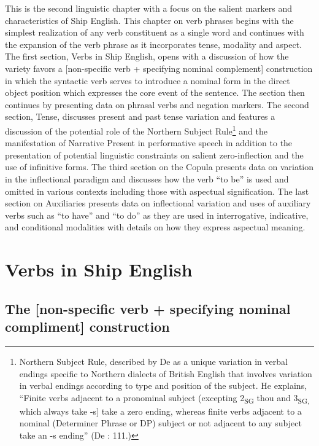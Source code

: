 This is the second linguistic chapter with a focus on the salient markers and characteristics of Ship English. This chapter on verb phrases begins with the simplest realization of any verb constituent as a single word and continues with the expansion of the verb phrase as it incorporates tense, modality and aspect. The first section, Verbs in Ship English, opens with a discussion of how the variety favors a [non-specific verb + specifying nominal complement] construction in which the syntactic verb serves to introduce a nominal form in the direct object position which expresses the core event of the sentence.  The section then continues by presenting data on phrasal verbs and negation markers. The second section, Tense, discusses present and past tense variation and features a discussion of the potential role of the Northern Subject Rule\footnote{Northern Subject Rule, described by De \citet{Haas2006} as a unique variation in verbal endings specific to Northern dialects of British English that involves variation in verbal endings according to type and position of the subject. He explains, “Finite verbs adjacent to a pronominal subject (excepting 2\textsubscript{SG} thou and 3\textsubscript{SG,} which always take -s] take a zero ending, whereas finite verbs adjacent to a nominal (Determiner Phrase or DP) subject or not adjacent to any subject take an -s ending” (De \citealt{Haas2006}: 111.)} and the manifestation of Narrative Present in performative speech in addition to the presentation of potential linguistic constraints on salient zero-inflection and the use of infinitive forms. The third section on the Copula presents data on variation in the inflectional paradigm and discusses how the verb “to be” is used and omitted in various contexts including those with aspectual signification. The last section on Auxiliaries presents data on inflectional variation and uses of auxiliary verbs such as “to have” and “to do” as they are used in interrogative, indicative, and conditional modalities with details on how they express aspectual meaning. 

\section{\textbf{Verbs} \textbf{in} \textbf{Ship} \textbf{English}}%

\subsection{\textbf{The} \textbf{[non-specific} \textbf{verb} \textbf{+} \textbf{specifying} \textbf{nominal} \textbf{compliment]} \textbf{construction}}%

